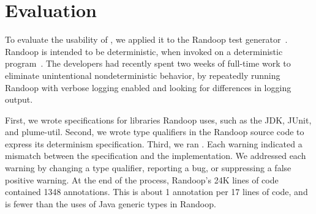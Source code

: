 \section{Evaluation\label{sec:results}}
To evaluate the usability of \theDeterminismChecker,
we applied it to the Randoop test
generator~\cite{PachecoLEB2007}.
Randoop is intended to be deterministic, when invoked on a deterministic
program~\cite{randoop-manual}.
The developers had recently
spent two weeks of full-time work to
eliminate unintentional nondeterministic behavior, by repeatedly
running Randoop with verbose logging enabled and
looking for differences in logging output.

First, we wrote specifications for libraries Randoop uses, such as the JDK,
JUnit, and plume-util.
Second, we wrote type qualifiers in the Randoop source code to express its
determinism specification.
Third, we ran
\theDeterminismChecker.  Each warning indicated a mismatch between the
specification and the implementation.  We addressed each warning by changing a
type qualifier, reporting a bug, or suppressing a false positive warning.
At the end of the process, Randoop's 24K lines of code contained 1348 annotations.
This is about 1 annotation per 17 lines of code,
and is fewer than the uses
of Java generic types in Randoop.

